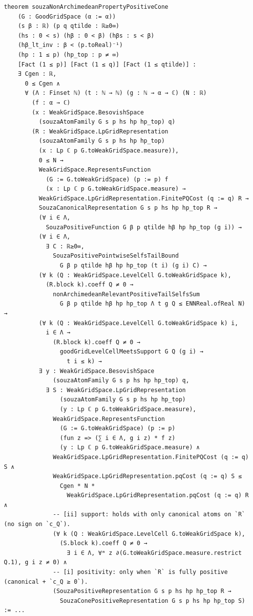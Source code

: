 \documentclass[11pt]{amsart}
\theoremstyle{definition}
\begin{document}
\begin{lstlisting}[style=lean,basicstyle=\ttfamily\scriptsize]
theorem souzaNonArchimedeanPropertyPositiveCone
    (G : GoodGridSpace (α := α))
    (s β : ℝ) (p q qtilde : ℝ≥0∞)
    (hs : 0 < s) (hβ : 0 < β) (hβs : s < β)
    (hβ_lt_inv : β < (p.toReal)⁻¹)
    (hp : 1 ≤ p) (hp_top : p ≠ ∞)
    [Fact (1 ≤ p)] [Fact (1 ≤ q)] [Fact (1 ≤ qtilde)] :
    ∃ Cgen : ℝ,
      0 ≤ Cgen ∧
      ∀ (Λ : Finset ℕ) (t : ℕ → ℕ) (g : ℕ → α → ℂ) (N : ℝ)
        (f : α → ℂ)
        (x : WeakGridSpace.BesovishSpace
          (souzaAtomFamily G s p hs hp hp_top) q)
        (R : WeakGridSpace.LpGridRepresentation
          (souzaAtomFamily G s p hs hp hp_top)
          (x : Lp ℂ p G.toWeakGridSpace.measure)),
          0 ≤ N →
          WeakGridSpace.RepresentsFunction
            (G := G.toWeakGridSpace) (p := p) f
            (x : Lp ℂ p G.toWeakGridSpace.measure) →
          WeakGridSpace.LpGridRepresentation.FinitePQCost (q := q) R →
          SouzaCanonicalRepresentation G s p hs hp hp_top R →
          (∀ i ∈ Λ,
            SouzaPositiveFunction G β p qtilde hβ hp hp_top (g i)) →
          (∀ i ∈ Λ,
            ∃ C : ℝ≥0∞,
              SouzaPositivePointwiseSelfsTailBound
                G β p qtilde hβ hp hp_top (t i) (g i) C) →
          (∀ k (Q : WeakGridSpace.LevelCell G.toWeakGridSpace k),
            (R.block k).coeff Q ≠ 0 →
              nonArchimedeanRelevantPositiveTailSelfsSum
                G β p qtilde hβ hp hp_top Λ t g Q ≤ ENNReal.ofReal N) →
          (∀ k (Q : WeakGridSpace.LevelCell G.toWeakGridSpace k) i,
            i ∈ Λ →
              (R.block k).coeff Q ≠ 0 →
                goodGridLevelCellMeetsSupport G Q (g i) →
                  t i ≤ k) →
          ∃ y : WeakGridSpace.BesovishSpace
              (souzaAtomFamily G s p hs hp hp_top) q,
            ∃ S : WeakGridSpace.LpGridRepresentation
                (souzaAtomFamily G s p hs hp hp_top)
                (y : Lp ℂ p G.toWeakGridSpace.measure),
              WeakGridSpace.RepresentsFunction
                (G := G.toWeakGridSpace) (p := p)
                (fun z => (∑ i ∈ Λ, g i z) * f z)
                (y : Lp ℂ p G.toWeakGridSpace.measure) ∧
              WeakGridSpace.LpGridRepresentation.FinitePQCost (q := q) S ∧
              WeakGridSpace.LpGridRepresentation.pqCost (q := q) S ≤
                Cgen * N *
                  WeakGridSpace.LpGridRepresentation.pqCost (q := q) R ∧
              -- [ii] support: holds with only canonical atoms on `R` (no sign on `c_Q`).
              (∀ k (Q : WeakGridSpace.LevelCell G.toWeakGridSpace k),
                (S.block k).coeff Q ≠ 0 →
                  ∃ i ∈ Λ, ∀ᵐ z ∂(G.toWeakGridSpace.measure.restrict Q.1), g i z ≠ 0) ∧
              -- [i] positivity: only when `R` is fully positive (canonical + `c_Q ≥ 0`).
              (SouzaPositiveRepresentation G s p hs hp hp_top R →
                SouzaConePositiveRepresentation G s p hs hp hp_top S) := ...


\end{lstlisting}
\end{document}
